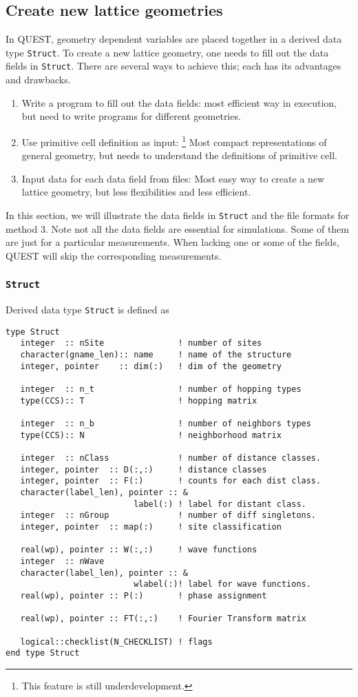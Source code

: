 \documentclass[12pt]{article}
\begin{document}
\subsection{Create new lattice geometries}
In QUEST, geometry dependent variables are placed together in a derived data type \verb"Struct". To create a new lattice geometry, one needs to fill out the data fields in \verb"Struct". There are several ways to achieve this; each has its advantages and drawbacks.
\begin{enumerate}
  \item Write a program to fill out the data fields: most efficient way in execution, but need to write programs for different geometries.
  \item Use primitive cell definition as input: \footnote{This feature is still underdevelopment.} Most compact representations of general geometry, but needs to understand the definitions of primitive cell.
  \item Input data for each data field from files: Most easy way to create a new lattice geometry, but less flexibilities and less efficient.
\end{enumerate}

In this section, we will illustrate the data fields in \verb"Struct" and the file formats for method 3. Note not all the data fields are essential for simulations. Some of them are just for a particular measurements. When lacking one or some of the fields, QUEST will skip the corresponding measurements.

\subsubsection{\tt Struct}
Derived data type \verb"Struct" is defined as
\begin{verbatim}
type Struct
   integer  :: nSite               ! number of sites
   character(gname_len):: name     ! name of the structure
   integer, pointer    :: dim(:)   ! dim of the geometry

   integer  :: n_t                 ! number of hopping types
   type(CCS):: T                   ! hopping matrix

   integer  :: n_b                 ! number of neighbors types
   type(CCS):: N                   ! neighborhood matrix

   integer  :: nClass              ! number of distance classes.
   integer, pointer  :: D(:,:)     ! distance classes
   integer, pointer  :: F(:)       ! counts for each dist class.
   character(label_len), pointer :: &
                          label(:) ! label for distant class.
   integer  :: nGroup              ! number of diff singletons.
   integer, pointer  :: map(:)     ! site classification

   real(wp), pointer :: W(:,:)     ! wave functions
   integer  :: nWave
   character(label_len), pointer :: &
                          wlabel(:)! label for wave functions.
   real(wp), pointer :: P(:)       ! phase assignment

   real(wp), pointer :: FT(:,:)    ! Fourier Transform matrix

   logical::checklist(N_CHECKLIST) ! flags
end type Struct
\end{verbatim}
\end{document}
